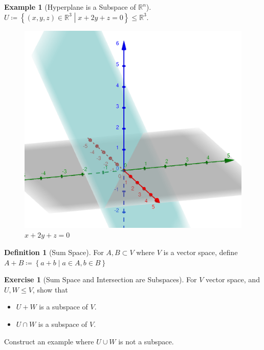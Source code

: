 \documentclass[12pt, a4paper]{article}
\newcommand{\R}{\mathbb{R}}
\theoremstyle{remark}
\theoremstyle{definition}
\newtheorem{definition}{Definition}
\newtheorem{example}{Example}
\newtheorem{exercise}{Exercise}
\numberwithin{equation}{section}
\numberwithin{definition}{section}
\numberwithin{example}{section}
\numberwithin{exercise}{section}
\numberwithin{remark}{section}
\numberwithin{figure}{section}
\begin{document}
\begin{example}[Hyperplane is a Subspace of $\R^n$]
    $U \coloneqq \left\{ \left( x,y,z \right) \in \R^3 \middle| x + 2y + z = 0\right\} \leq \R^3$.
    \begin{figure}[h]
        \centering
        \includegraphics[scale=0.2]{hyperplane121}
        \caption{$x + 2y + z = 0$}
    \end{figure}
\end{example}
\begin{definition}[Sum Space]
    For $A,B \subset V$ where $V$ is a vector space, define $A + B \coloneqq \left\{ a + b \middle| a\in A, b \in B \right\}$
\end{definition}
\begin{exercise}[Sum Space and Intersection are Subspaces]
    For $V$ vector space, and $U,W \leq V$, show that
    \begin{itemize}
        \item $U + W$ is a subspace of $V$.
        \item $U \cap W$ is a subspace of $V$.
    \end{itemize}
    Construct an example where $U \cup W$ is not a subspace.
\end{exercise}
\end{document}
